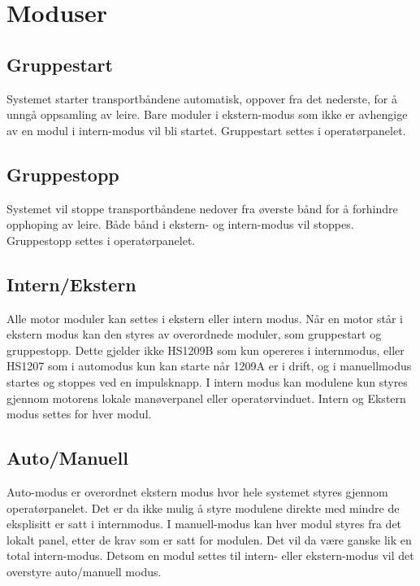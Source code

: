 \section{Moduser}
\subsection{Gruppestart}
	Systemet starter transportbåndene automatisk, oppover fra det nederste, for å unngå oppsamling av leire. Bare moduler i ekstern-modus som ikke er avhengige av en modul i intern-modus vil bli startet. Gruppestart settes i operatørpanelet.

\subsection{Gruppestopp}
	Systemet vil stoppe transportbåndene nedover fra øverste bånd for å forhindre opphoping av leire. Både bånd i ekstern- og intern-modus vil stoppes. Gruppestopp settes i operatørpanelet.

\subsection{Intern/Ekstern}
	Alle motor moduler kan settes i ekstern eller intern modus. Når en motor står i ekstern modus kan den styres av overordnede moduler, som gruppestart og gruppestopp. Dette gjelder ikke HS1209B som kun opereres i internmodus, eller HS1207 som i automodus kun kan starte når 1209A er i drift, og i manuellmodus startes og stoppes ved en impulsknapp. I intern modus kan modulene kun styres gjennom motorens lokale manøverpanel eller operatørvinduet. Intern og Ekstern modus settes for hver modul.

\subsection{Auto/Manuell}
	Auto-modus er overordnet ekstern modus hvor hele systemet styres gjennom operatørpanelet. Det er da ikke mulig å styre modulene direkte med mindre de eksplisitt er satt i internmodus. I manuell-modus kan hver modul styres fra det lokalt panel, etter de krav som er satt for modulen. Det vil da være ganske lik en total intern-modus. Detsom en modul settes til intern- eller ekstern-modus vil det overstyre auto/manuell modus.
